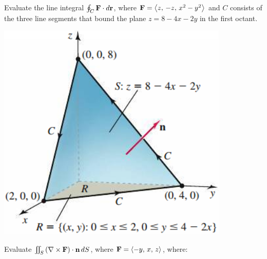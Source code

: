 \documentclass[../mathNotesPreamble]{subfiles}
\begin{document}
  \begin{ex*}
    Evaluate the line integral $\oint_C \mathbf F\cdot d{\mathbf{r}}$, where $\mathbf F={\left\langle z,\,-z,\, x^2-y^2 \right\rangle}$ and $C$ consists of the three line segments that bound the plane $z=8-4x-2y$ in the first octant.
  \end{ex*}
  \begin{flushright}
    \includegraphics[width=0.35\linewidth]{../images/briggs_17_07/fig17_62}
  \end{flushright}
  \pagebreak

  \begin{ex*}
    Evaluate $\iint_S {\left(\nabla\times\mathbf F\right)}\cdot{\mathbf{n}}\,dS$, where $\mathbf F={\left\langle -y,\,x,\,z \right\rangle}$, where:
  \end{ex*}
\end{document}
